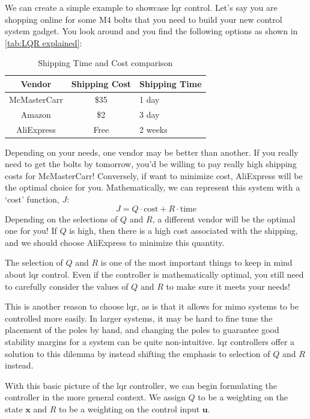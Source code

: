 \begin{example}
    We can create a simple example to showcase \gls{lqr} control. Let's say you are shopping online for some M4 bolts that you need to build your new control system gadget. You look around and you find the following options as shown in \autoref{tab:LQR explained}:
\begin{table}[H]
    \centering
    \begin{tabular}{c|cl}
         Vendor&   Shipping Cost&Shipping Time\\\midrule
         McMasterCarr& 
     \$35&1 day\\
 Amazon& \$2&3 day\\
 AliExpress& Free&2 weeks
 \end{tabular}
    \caption{Shipping Time and Cost comparison}
    \label{tab:LQR explained}
\end{table}

Depending on your needs, one vendor may be better than another. If you really need to get the bolts by tomorrow, you'd be willing to pay really high shipping costs for McMasterCarr! Conversely, if want to minimize cost, AliExpress will be the optimal choice for you. Mathematically, we can represent this system with a `cost' function, $J$:
$$J=Q\cdot\mathrm{cost}+R\cdot\mathrm{time}$$
Depending on the selections of $Q$ and $R$, a different vendor will be the optimal one for you! If $Q$ is high, then there is a high cost associated with the shipping, and we should choose AliExpress to minimize this quantity.
\end{example}

The selection of $Q$ and $R$ is one of the most important things to keep in mind about \gls{lqr} control. Even if the controller is mathematically optimal, you still need to carefully consider the values of $Q$ and $R$ to make sure it meets your needs!

This is another reason to choose \gls{lqr}, as is that it allows for \gls{mimo} systems to be controlled more easily. In larger systems, it may be hard to fine tune the placement of the poles by hand, and changing the poles to guarantee good stability margins for a system can be quite non-intuitive. \Gls{lqr} controllers offer a solution to this dilemma by instead shifting the emphasis to selection of $Q$ and $R$ instead.

With this basic picture of the \gls{lqr} controller, we can begin formulating the controller in the more general context. We assign $Q$ to be a weighting on the state $\bm{x}$ and $R$ to be a weighting on the control input $\bm{u}$.


